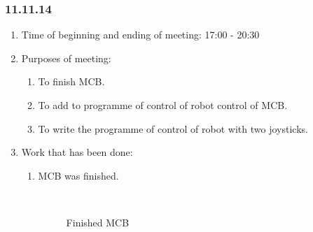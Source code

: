 
\subsubsection{11.11.14}

\begin{enumerate} 
	\item Time of beginning and ending of meeting:
	17:00 - 20:30
	\item Purposes of meeting:
	\begin{enumerate}
		\item To finish MCB.
		
		\item To add to programme of control of robot control of MCB.
		
		\item To write the programme of control of robot with two joysticks.
		
	\end{enumerate}
	
	\item Work that has been done:
	\begin{enumerate}
		\item MCB was finished.
		
		\begin{figure}[H]
			\begin{minipage}[h]{0.47\linewidth}
			\end{minipage}
			\begin{minipage}[h]{0.47\linewidth}
			\end{minipage}
			\caption{Finished MCB}
		\end{figure}
		

\end{enumerate}
\end{enumerate}
